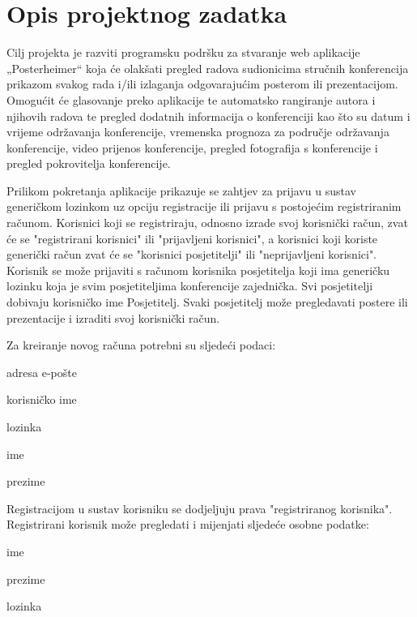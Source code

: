 \chapter{Opis projektnog zadatka}
		
		Cilj projekta je razviti programsku podršku za stvaranje web aplikacije „Posterheimer“ koja će olakšati pregled radova sudionicima stručnih konferencija prikazom svakog rada i/ili izlaganja odgovarajućim posterom ili prezentacijom. Omogućit će glasovanje preko aplikacije te automatsko rangiranje autora i njihovih radova te pregled dodatnih informacija o konferenciji kao što su datum i vrijeme održavanja konferencije, vremenska prognoza za područje održavanja konferencije, video prijenos konferencije, pregled fotografija s konferencije i pregled pokrovitelja konferencije.
		
		Prilikom pokretanja aplikacije prikazuje se zahtjev za prijavu u sustav generičkom lozinkom uz opciju registracije ili prijavu s postojećim registriranim računom.
		Korisnici koji se registriraju, odnosno izrade svoj korisnički račun, zvat će se "registrirani korisnici" ili "prijavljeni korisnici", a korisnici koji koriste generički račun zvat će se "korisnici posjetitelji" ili "neprijavljeni korisnici". Korisnik se može prijaviti s računom korisnika posjetitelja koji ima generičku lozinku koja je svim posjetiteljima konferencije zajednička. Svi posjetitelji dobivaju korisničko ime Posjetitelj. Svaki posjetitelj može pregledavati postere ili prezentacije i izraditi svoj korisnički račun.
		
		Za kreiranje novog računa potrebni su sljedeći podaci:
		\begin{packed_item}
			\item adresa e-pošte
			\item korisničko ime
			\item lozinka
			\item ime
			\item prezime
		\end{packed_item}
		
		Registracijom u sustav korisniku se dodjeljuju prava "registriranog korisnika". Registrirani korisnik može pregledati i mijenjati sljedeće osobne podatke:
		\begin{packed_item}
			\item ime
			\item prezime
			\item lozinka
		\end{packed_item}

